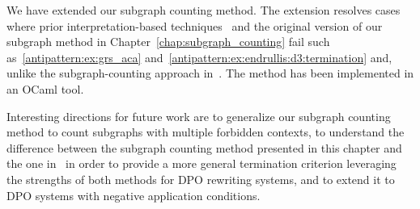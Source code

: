We have extended our subgraph counting method.
The extension resolves cases where prior interpretation-based techniques~\cite{zantema2014termination,bruggink2014termination,bruggink2015proving,endrullis2024generalized_arxiv_v2,overbeek2024termination_lmcs}
and the original version of our subgraph method in Chapter~\ref{chap:subgraph_counting}
fail such as~\autoref{antipattern:ex:grs_aca} and~\autoref{antipattern:ex:endrullis:d3:termination} and, unlike the subgraph-counting approach in~\cite{overbeek2024termination_lmcs}.
The method has been implemented in an OCaml tool.

Interesting directions for future work are to generalize our subgraph counting method to count subgraphs with multiple forbidden contexts, to understand the difference between the subgraph counting method presented in this chapter and the one in~\cite{overbeek2024termination_lmcs} in order to provide a more general termination criterion leveraging the strengths of both methods for DPO rewriting systems, and to extend it to DPO systems with negative application conditions.